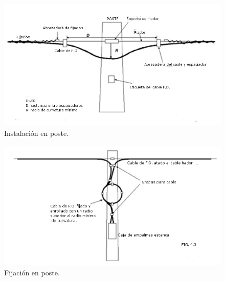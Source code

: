\documentclass[12pt,letterpaper]{article}
\begin{document}
\newpage
\begin{figure}[ht]
    \centering
    \includegraphics[width=.7\textwidth]{imagenes/ta1.jpg}
    \caption{Instalación en poste.}
\end{figure}

\begin{figure}[ht]
    \centering
    \includegraphics[width=.7\textwidth]{imagenes/ta2.jpg}
    \caption{Fijación en poste.}
\end{figure}

\newpage
\end{document}
